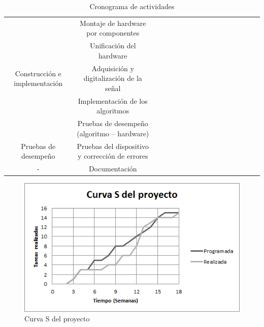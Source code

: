 \documentclass[11pt,lettersize]{article} %
\begin{document}
\begin{table}[H]
\begin{center}
{\begin{tabular}{|c|c|c|c|c|c|c|c|c|c|c|c|c|c|c|c|c|}
\multirow{5}{*}{Construcción e implementación} & Montaje de hardware por componentes & & & & & & &\cellcolor[gray]{0.6} &\cellcolor[gray]{0.6} &\cellcolor[gray]{0.6} &\cellcolor[gray]{0.6} & & & & & \\ \cline{2-17}
& Unificación del hardware & & & & & & & & \cellcolor[gray]{0.6}& \cellcolor[gray]{0.6}& \cellcolor[gray]{0.6}& \cellcolor[gray]{0.6}& \cellcolor[gray]{0.6}& & & \\ \cline{2-17}
& Adquisición y digitalización de la señal & & & & & & & & &\cellcolor[gray]{0.6} &\cellcolor[gray]{0.6} &\cellcolor[gray]{0.6} & & & & \\ \cline{2-17}
& Implementación de los algoritmos & & & & & & & & & &\cellcolor[gray]{0.6} &\cellcolor[gray]{0.6} &\cellcolor[gray]{0.6} &\cellcolor[gray]{0.6} & & \\ \cline{2-17}
& Pruebas de desempeño (algoritmo – hardware) & & & & & & & & & & &\cellcolor[gray]{0.6} &\cellcolor[gray]{0.6} &\cellcolor[gray]{0.6} &\cellcolor[gray]{0.6} & \\ \hline

\multirow{1}{*}{Pruebas de desempeño} & Pruebas del dispositivo y corrección de errores & & & & & &\cellcolor[gray]{0.6} &\cellcolor[gray]{0.6} &\cellcolor[gray]{0.6} &\cellcolor[gray]{0.6} &\cellcolor[gray]{0.6} &\cellcolor[gray]{0.6} &\cellcolor[gray]{0.6} &\cellcolor[gray]{0.6} &\cellcolor[gray]{0.6} & \\ \hline

- & Documentación &\cellcolor[gray]{0.6} &\cellcolor[gray]{0.6} &\cellcolor[gray]{0.6} &\cellcolor[gray]{0.6} &\cellcolor[gray]{0.6} &\cellcolor[gray]{0.6} &\cellcolor[gray]{0.6} &\cellcolor[gray]{0.6} &\cellcolor[gray]{0.6} &\cellcolor[gray]{0.6} &\cellcolor[gray]{0.6} &\cellcolor[gray]{0.6} &\cellcolor[gray]{0.6} &\cellcolor[gray]{0.6} &\cellcolor[gray]{0.6} \\ \hline
\end{tabular} }
\end{center}
\caption{Cronograma de actividades}
\label{cronograma}
\end{table}
\begin{figure}[h!]
	\centering
	\includegraphics[width=.8\textwidth]{images/s-curve.png}
	\caption{Curva S del proyecto}
	\label{F-s-curve}
\end{figure}
\end{document}

